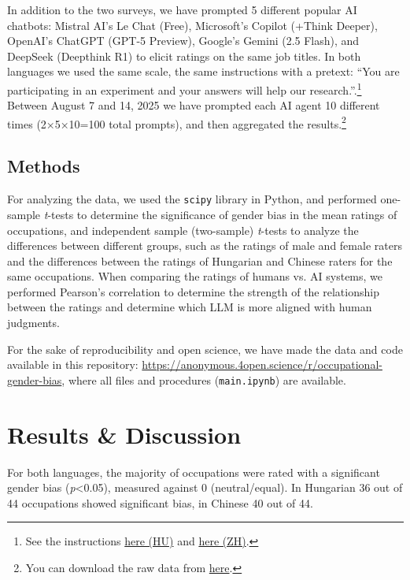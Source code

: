 \documentclass[11pt]{article}
\begin{document}
In addition to the two surveys, we have prompted 5 different popular AI chatbots: Mistral AI's Le Chat (Free), Microsoft's Copilot (+Think Deeper), OpenAI's ChatGPT (GPT-5 Preview), Google's Gemini (2.5 Flash), and DeepSeek (Deepthink R1) to elicit ratings on the same job titles. In both languages we used the same scale, the same instructions with a pretext: ``You are participating in an experiment and your answers will help our research.''.\footnote{See the instructions \href{https://anonymous.4open.science/r/occupational-gender-bias/instructions_hu.txt}{here (HU)} and \href{https://anonymous.4open.science/r/occupational-gender-bias/instructions_zh.txt}{here (ZH)}.} Between August 7 and 14, 2025 we have prompted each AI agent 10 different times (2×5×10=100 total prompts), and then aggregated the results.\footnote{You can download the raw data from \href{https://anonymous.4open.science/r/occupational-gender-bias/occupations.xlsx}{here}.}

\subsection{Methods}

For analyzing the data, we used the \texttt{scipy} library in Python, and performed one-sample \textit{t}-tests to determine the significance of gender bias in the mean ratings of occupations, and independent sample (two-sample) \textit{t}-tests to analyze the differences between different groups, such as the ratings of male and female raters and the differences between the ratings of Hungarian and Chinese raters for the same occupations. When comparing the ratings of humans vs. AI systems, we performed Pearson's correlation to determine the strength of the relationship between the ratings and determine which LLM is more aligned with human judgments. 

For the sake of reproducibility and open science, we have made the data and code available in this repository: \href{https://anonymous.4open.science/r/occupational-gender-bias}{https://anonymous.4open.science/r/occupational-gender-bias}, where all files and procedures (\texttt{main.ipynb}) are available.

\section{Results \& Discussion}\label{sec:results}

For both languages, the majority of occupations were rated with a significant gender bias (\textit{p}<0.05), measured against 0 (neutral/equal). In Hungarian 36 out of 44 occupations showed significant bias, in Chinese 40 out of 44.
\end{document}
